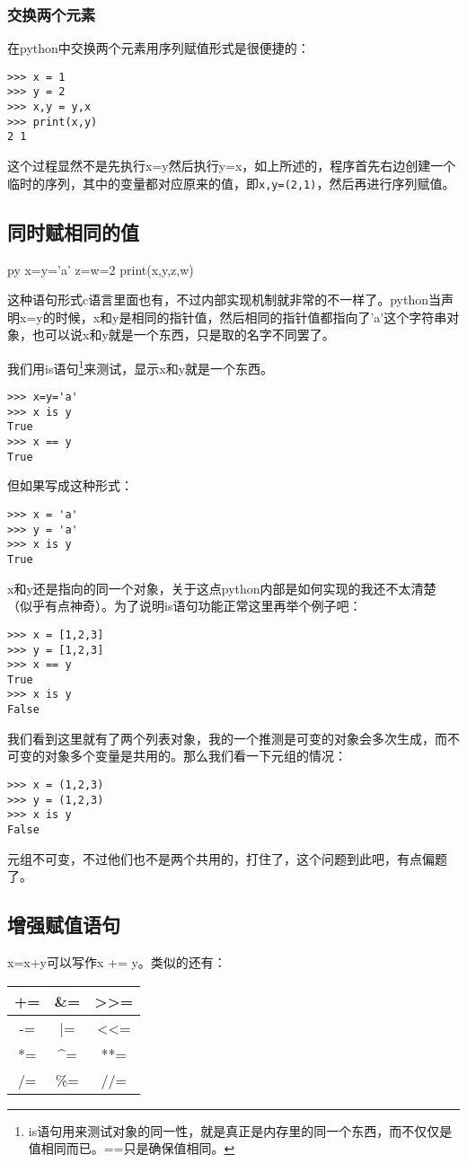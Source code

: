 \documentclass[12pt,oneside]{book}
\begin{document}
\begin{common-format}
\subsubsection{交换两个元素}
在python中交换两个元素用序列赋值形式是很便捷的：
\begin{Verbatim}
>>> x = 1
>>> y = 2
>>> x,y = y,x
>>> print(x,y)
2 1
\end{Verbatim}
这个过程显然不是先执行x=y然后执行y=x，如上所述的，程序首先右边创建一个临时的序列，其中的变量都对应原来的值，即\verb+x,y=(2,1)+，然后再进行序列赋值。



\subsection{同时赋相同的值}
\begin{xverbatim}[129]{py}
x=y='a'
z=w=2
print(x,y,z,w)
\end{xverbatim}

这种语句形式c语言里面也有，不过内部实现机制就非常的不一样了。python当声明x=y的时候，x和y是相同的指针值，然后相同的指针值都指向了'a'这个字符串对象，也可以说x和y就是一个东西，只是取的名字不同罢了。

我们用is语句\footnote{is语句用来测试对象的同一性，就是真正是内存里的同一个东西，而不仅仅是值相同而已。==只是确保值相同。}来测试，显示x和y就是一个东西。
\begin{Verbatim}
>>> x=y='a'
>>> x is y
True
>>> x == y
True
\end{Verbatim}


但如果写成这种形式：
\begin{Verbatim}
>>> x = 'a'
>>> y = 'a'
>>> x is y
True
\end{Verbatim}
x和y还是指向的同一个对象，关于这点python内部是如何实现的我还不太清楚（似乎有点神奇）。为了说明is语句功能正常这里再举个例子吧：
\begin{Verbatim}
>>> x = [1,2,3]
>>> y = [1,2,3]
>>> x == y
True
>>> x is y
False
\end{Verbatim}
我们看到这里就有了两个列表对象，我的一个推测是可变的对象会多次生成，而不可变的对象多个变量是共用的。那么我们看一下元组的情况：
\begin{Verbatim}
>>> x = (1,2,3)
>>> y = (1,2,3)
>>> x is y
False
\end{Verbatim}
元组不可变，不过他们也不是两个共用的，打住了，这个问题到此吧，有点偏题了。



\subsection{增强赋值语句}
x=x+y可以写作x += y。类似的还有：
\begin{tabular}{|c|c|c|}
\hline 
+= & \&{}= & >>= \\ 
\hline 
-= & |= & <<= \\ 
\hline 
*= & \^{}= & **= \\ 
\hline 
/= & \%{}= & //= \\ 
\hline 
\end{tabular} 


\end{common-format}
\end{document}
